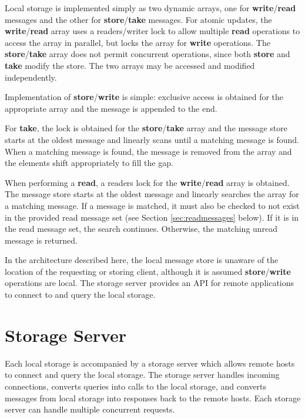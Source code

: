 Local storage is implemented simply as two dynamic arrays, one for \textbf{write}/\textbf{read} messages and the other for \textbf{store}/\textbf{take} messages. For atomic updates, the \textbf{write}/\textbf{read} array uses a readers/writer lock to allow multiple \textbf{read} operations to access the array in parallel, but locks the array for \textbf{write} operations. The \textbf{store}/\textbf{take} array does not permit concurrent operations, since both \textbf{store} and \textbf{take} modify the store. The two arrays may be accessed and modified independently.

Implementation of \textbf{store}/\textbf{write} is simple: exclusive access is obtained for the appropriate array and the message is appended  to the end. 

For \textbf{take}, the lock is obtained for the \textbf{store}/\textbf{take} array and the message store starts at the oldest message and linearly scans until a matching message is found. When a matching message is found, the message is removed from the array and the elements shift appropriately to fill the gap.

When performing a \textbf{read}, a readers lock for the \textbf{write}/\textbf{read} array is obtained. The message store starts at the oldest message and linearly searches the array for a matching message. If a message is matched, it must also be checked to not exist in the provided read message set (see Section \ref{sec:readmessages} below). If it is in the read message set, the search continues. Otherwise, the matching unread message is returned.

In the architecture described here, the local message store is unaware of the location of the requesting or storing client, although it is assumed \textbf{store}/\textbf{write} operations are local. The storage server provides an API for remote applications to connect to and query the local storage.

\section{Storage Server}

Each local storage is accompanied by a storage server which allows remote hosts to connect and query the local storage. The storage server handles incoming connections, converts queries into calls to the local storage, and converts messages from local storage into responses back to the remote hosts. Each storage server can handle multiple concurrent requests.

